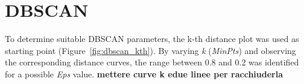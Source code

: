 


\section{DBSCAN}\label{sec:density_based}
To determine suitable DBSCAN parameters, the k-th distance plot was used as starting point (Figure~\ref{fig:dbscan_kth}). 
By varying \textit{k} (\textit{MinPts}) and observing the corresponding distance curves, the range between 0.8 and 0.2 was identified for a possible \textit{Eps} value. \textbf{mettere  curve k edue linee per racchiuderla}
